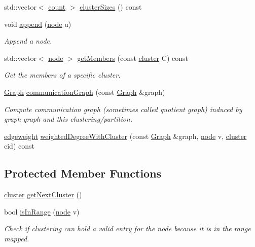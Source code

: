 \begin{DoxyCompactItemize}
std\-::vector$<$ \hyperlink{namespace_networ_kit_a76b399edfa50ae72e4aa86007aaa800a}{count} $>$ \hyperlink{class_networ_kit_1_1_clustering_ae8a9188ae1d305c2aee7f905453d0645}{cluster\-Sizes} () const 
\item 
void \hyperlink{class_networ_kit_1_1_clustering_a03d111745ecf44e55a2bd77239689c5f}{append} (\hyperlink{namespace_networ_kit_a53fe3e4fd04ea024160e4d024dfebadf}{node} u)
\begin{DoxyCompactList}\small\item\em Append a node. \end{DoxyCompactList}\item 
std\-::vector$<$ \hyperlink{namespace_networ_kit_a53fe3e4fd04ea024160e4d024dfebadf}{node} $>$ \hyperlink{class_networ_kit_1_1_clustering_aa92b0d1b23ba5cf71913f39c0470f437}{get\-Members} (const \hyperlink{namespace_networ_kit_a189884f50c41226806b31842d2214b71}{cluster} C) const 
\begin{DoxyCompactList}\small\item\em Get the members of a specific cluster. \end{DoxyCompactList}\item 
\hyperlink{class_networ_kit_1_1_graph}{Graph} \hyperlink{class_networ_kit_1_1_clustering_a6187c02734b9174b335e604840f2bd64}{communication\-Graph} (const \hyperlink{class_networ_kit_1_1_graph}{Graph} \&graph)
\begin{DoxyCompactList}\small\item\em Compute communication graph (sometimes called quotient graph) induced by graph {\itshape graph} and this clustering/partition. \end{DoxyCompactList}\item 
\hyperlink{namespace_networ_kit_a831b108dbcd79dad062d9e28b1b4e3dd}{edgeweight} \hyperlink{class_networ_kit_1_1_clustering_a52550f8c7d20b3d61f5cd6dc9b59d927}{weighted\-Degree\-With\-Cluster} (const \hyperlink{class_networ_kit_1_1_graph}{Graph} \&graph, \hyperlink{namespace_networ_kit_a53fe3e4fd04ea024160e4d024dfebadf}{node} v, \hyperlink{namespace_networ_kit_a189884f50c41226806b31842d2214b71}{cluster} cid) const 
\end{DoxyCompactItemize}
\subsection*{Protected Member Functions}
\begin{DoxyCompactItemize}
\item 
\hyperlink{namespace_networ_kit_a189884f50c41226806b31842d2214b71}{cluster} \hyperlink{class_networ_kit_1_1_clustering_a4a6048b511cd71139d048150e99096b1}{get\-Next\-Cluster} ()
\item 
bool \hyperlink{class_networ_kit_1_1_clustering_a734d01f0dc90fcd782dfb2f72aecc9f4}{is\-In\-Range} (\hyperlink{namespace_networ_kit_a53fe3e4fd04ea024160e4d024dfebadf}{node} v)
\begin{DoxyCompactList}\small\item\em Check if clustering can hold a valid entry for the node because it is in the range mapped. \end{DoxyCompactList}\end{DoxyCompactItemize}
